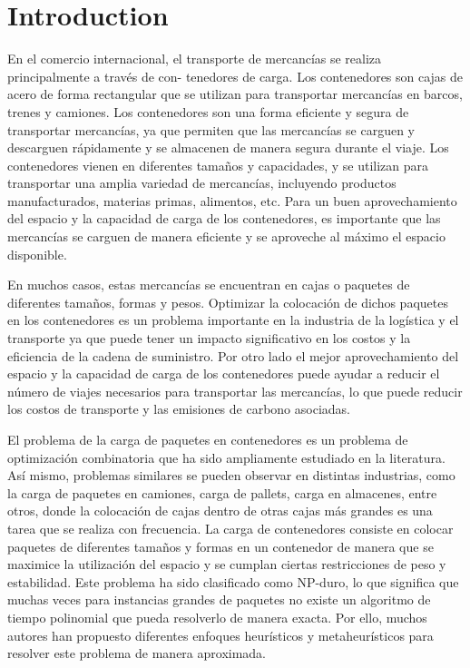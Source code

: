 \section{Introduction} \label{sec: introduction}

En el comercio internacional, el transporte de mercancías se realiza principalmente a través de con- tenedores de carga. Los contenedores son cajas de acero de forma rectangular que se utilizan para transportar mercancías en barcos, trenes y camiones. Los contenedores son una forma eficiente y segura de transportar mercancías, ya que permiten que las mercancías se carguen y descarguen rápidamente y se almacenen de manera segura durante el viaje. Los contenedores vienen en diferentes tamaños y capacidades, y se utilizan para transportar una amplia variedad de mercancías, incluyendo productos manufacturados, materias primas, alimentos, etc. Para un buen aprovechamiento del espacio y la capacidad de carga de los contenedores, es importante que las mercancías se carguen de manera eficiente y se aproveche al máximo el espacio disponible.

En muchos casos, estas mercancías se encuentran en cajas o paquetes de diferentes tamaños, formas y pesos. Optimizar la colocación de dichos paquetes en los contenedores es un problema importante en la industria de la logística y el transporte ya que puede tener un impacto significativo en los costos y la eficiencia de la cadena de suministro. Por otro lado el mejor aprovechamiento del espacio y la capacidad de carga de los contenedores puede ayudar a reducir el número de viajes necesarios para transportar las mercancías, lo que puede reducir los costos de transporte y las emisiones de carbono asociadas.

El problema de la carga de paquetes en contenedores es un problema de optimización combinatoria que ha sido ampliamente estudiado en la literatura. Así mismo, problemas similares se pueden observar en distintas industrias, como la carga de paquetes en camiones, carga de pallets, carga en almacenes, entre otros, donde la colocación de cajas dentro de otras cajas más grandes es una tarea que se realiza con frecuencia. La carga de contenedores consiste en colocar paquetes de diferentes tamaños y formas en un contenedor de manera que se maximice la utilización del espacio y se cumplan ciertas restricciones de peso y estabilidad. Este problema ha sido clasificado como NP-duro, lo que significa que muchas veces para instancias grandes de paquetes no existe un algoritmo de tiempo polinomial que pueda resolverlo de manera exacta. Por ello, muchos autores han propuesto diferentes enfoques heurísticos y metaheurísticos para resolver este problema de manera aproximada.

